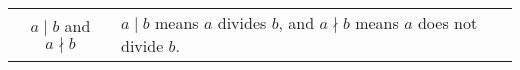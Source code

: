 \begin{tabular}{c p{}}
$a\mid b$ and $a\nmid b$ & $a\mid b$ means $a$ divides $b$, and $a\nmid b$ means $a$ does not divide $b$.\\
\end{tabular}





